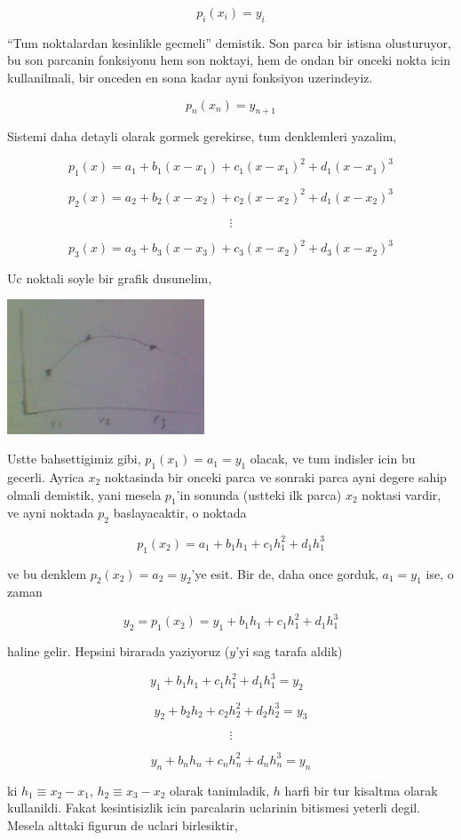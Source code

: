 \documentclass[12pt,fleqn]{article}\usepackage{common}
\begin{document}
\[ p_i(x_i) = y_i \]

``Tum noktalardan kesinlikle gecmeli'' demistik. Son parca bir istisna
olusturuyor, bu son parcanin fonksiyonu hem son noktayi, hem de ondan bir
onceki nokta icin kullanilmali, bir onceden en sona kadar ayni fonksiyon
uzerindeyiz. 

\[ p_{n}(x_n) = y_{n+1} \]

Sistemi daha detayli olarak gormek gerekirse, tum denklemleri yazalim,

\[ p_1(x)  = a_1 + b_1(x-x_1) + c_1(x-x_1)^2 + d_1(x-x_1)^3\]

\[ p_2(x)  = a_2 + b_2(x-x_2) + c_2(x-x_2)^2 + d_1(x-x_2)^3\]

\[ \vdots \]

\[ p_3(x)  = a_3 + b_3(x-x_3) + c_3(x-x_2)^2 + d_3(x-x_2)^3\]

Uc noktali soyle bir grafik dusunelim,

\includegraphics[height=4cm]{spline2.png}

Ustte bahsettigimiz gibi, $p_1(x_1) = a_1 = y_1$ olacak, ve tum indisler
icin bu gecerli. Ayrica $x_2$ noktasinda bir onceki parca ve sonraki parca
ayni degere sahip olmali demistik, yani mesela $p_1$'in sonunda (ustteki
ilk parca) $x_2$ noktasi vardir, ve ayni noktada $p_2$ baslayacaktir, o
noktada 

\[ p_1(x_2) = a_1 + b_1h_1 + c_1h_1^2 + d_1h_1^3  \]

ve bu denklem $p_2(x_2) = a_2 = y_2$'ye esit. Bir de, daha once gorduk, $a_1 =
y_1$ 
ise, o zaman 

\[ y_2 = p_1(x_2) = y_1 + b_1h_1 + c_1h_1^2 + d_1h_1^3 \]

haline gelir. Hepsini birarada yaziyoruz ($y$'yi sag tarafa aldik)

\[ y_1 + b_1h_1 + c_1h_1^2 + d_1h_1^3 = y_2 \ \ \ \label{2} \]

\[ y_2 + b_2h_2 + c_2h_2^2 + d_2h_2^3 = y_3 \]

\[ \vdots \]

\[ y_n + b_nh_n + c_nh_n^2 + d_nh_n^3 = y_n \]

ki $h_1 \equiv x_2 - x_1$, $h_2 \equiv x_3 - x_2$ olarak tanimladik, $h$
harfi bir tur kisaltma olarak kullanildi. Fakat kesintisizlik icin
parcalarin uclarinin bitismesi yeterli degil. Mesela alttaki figurun de
uclari birlesiktir,
\end{document}
